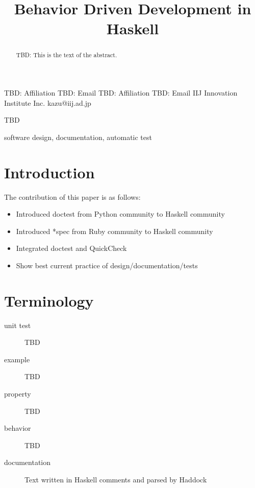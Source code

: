 \documentclass[preprint]{sigplanconf}
\begin{document}
\copyrightdata{[to be supplied]}


\title{Behavior Driven Development in Haskell}

           {TBD: Affiliation}
           {TBD: Email}
           {TBD: Affiliation}
           {TBD: Email}
           {IIJ Innovation Institute Inc.}
           {kazu@iij.ad.jp}

\maketitle

\begin{abstract}
TBD: This is the text of the abstract.
\end{abstract}


\terms
TBD

\keywords
software design, documentation, automatic test

\section{Introduction}

The contribution of this paper is as follows:

\begin{itemize}
\item Introduced doctest from Python community to Haskell community
\item Introduced *spec from Ruby community to Haskell community
\item Integrated doctest and QuickCheck
\item Show best current practice of design/documentation/tests
\end{itemize}

\section{Terminology}

\begin{description}
\item[unit test] TBD
\item[example] TBD
\item[property] TBD
\item[behavior] TBD
\item[documentation] Text written in Haskell comments and parsed by Haddock
\end{description}
\end{document}
